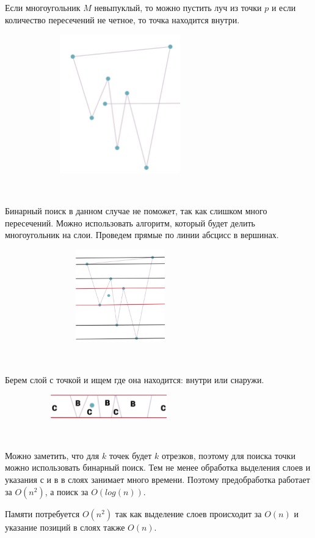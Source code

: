 Если многоугольник $M$ невыпуклый, то можно пустить луч из точки $p$ и если количество пересечений не четное, то точка находится внутри.

\hspace{1cm} \includegraphics[height=6cm, width=10cm]{nevipukli.png}

\

Бинарный поиск в данном случае не поможет, так как слишком много пересечений. Можно использовать алгоритм, который будет делить многоугольник на слои. Проведем прямые по линии абсцисс в вершинах.

\hspace{1cm} \includegraphics[height=4cm, width=10cm]{sloi.png}

\

Берем слой с точкой и ищем где она находится: внутри или снаружи.

\hspace{1cm} \includegraphics[height=1cm, width=9cm]{C_B.png}

\

Можно заметить, что для $k$ точек будет $k$ отрезков, поэтому для поиска точки можно использовать бинарный поиск. Тем не менее обработка выделения слоев и указания с и в в слоях занимает много времени. Поэтому предобработка работает за $O(n^2)$, а поиск за $O(log(n))$.

Памяти потребуется $O(n^2)$ так как выделение слоев происходит за $O(n)$ и указание позиций в слоях также $O(n)$.


